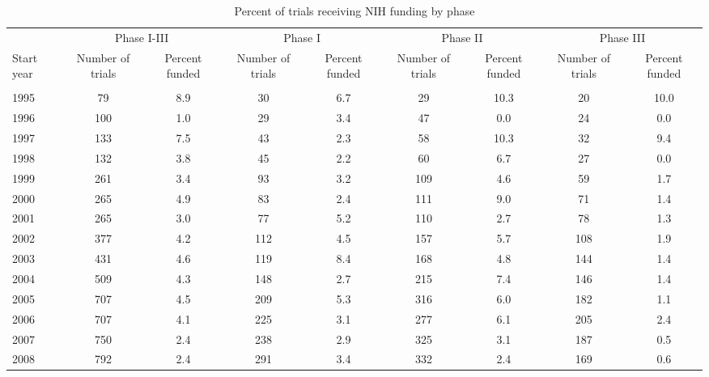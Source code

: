 \begin{table}[htbp]\centering
\caption{Percent of trials receiving NIH funding by phase}
\begin{tabular}{l*{4}{cc}}
\hline\hline
                &\multicolumn{2}{c}{Phase I-III}&\multicolumn{2}{c}{Phase I}&\multicolumn{2}{c}{Phase II}&\multicolumn{2}{c}{Phase III}\\
Start year      &Number of trials&Percent funded&Number of trials&Percent funded&Number of trials&Percent funded&Number of trials&Percent funded\\
\hline
                &         &         &         &         &         &         &         &         \\
1995            &       79&      8.9&       30&      6.7&       29&     10.3&       20&     10.0\\
1996            &      100&      1.0&       29&      3.4&       47&      0.0&       24&      0.0\\
1997            &      133&      7.5&       43&      2.3&       58&     10.3&       32&      9.4\\
1998            &      132&      3.8&       45&      2.2&       60&      6.7&       27&      0.0\\
1999            &      261&      3.4&       93&      3.2&      109&      4.6&       59&      1.7\\
2000            &      265&      4.9&       83&      2.4&      111&      9.0&       71&      1.4\\
2001            &      265&      3.0&       77&      5.2&      110&      2.7&       78&      1.3\\
2002            &      377&      4.2&      112&      4.5&      157&      5.7&      108&      1.9\\
2003            &      431&      4.6&      119&      8.4&      168&      4.8&      144&      1.4\\
2004            &      509&      4.3&      148&      2.7&      215&      7.4&      146&      1.4\\
2005            &      707&      4.5&      209&      5.3&      316&      6.0&      182&      1.1\\
2006            &      707&      4.1&      225&      3.1&      277&      6.1&      205&      2.4\\
2007            &      750&      2.4&      238&      2.9&      325&      3.1&      187&      0.5\\
2008            &      792&      2.4&      291&      3.4&      332&      2.4&      169&      0.6\\

\end{tabular}
\end{table}
